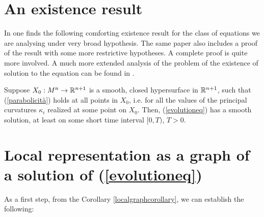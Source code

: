 \section{An existence result}
In \cite{huisken} one finds the following comforting existence result for the class of equations we are analysing under very broad hypothesis. The same paper also includes a proof of the result with some more restrictive hypotheses. A complete proof is quite more involved. A much more extended analysis of the problem of the existence of solution to the equation can be found in \cite{Gerhardt Curvature}. 


\begin{theorem}
	Suppose $X_0 : M^n \rightarrow \mathbb{R}^{n+1}$ is a smooth, closed hypersurface in $\mathbb{R}^{n+1}$, such that (\ref{parabolicità}) holds at all points in $X_0$, i.e. for all the values of the principal curvatures $\kappa_{i}$ realized at some point on $X_0$. Then, (\ref{evolutioneq}) has a smooth solution, at least on some short time interval $[0, T)$, $T > 0$.  \label{existence}
\end{theorem}

\section{Local representation as a graph of a solution of (\ref{evolutioneq})}
\label{representation as graph}
As a first step, from the Corollary \ref{localgraphcorollary}, we can establish the following:

